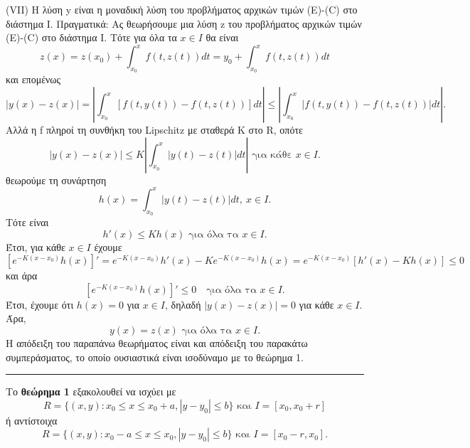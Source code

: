 \documentclass[11pt,a4paper,twoside]{book}
\newcommand{\eng}[1]{\selectlanguage{english}#1\selectlanguage{greek}}
\begin{document}
(VII) Η λύση y είναι η μοναδική λύση του προβλήματος αρχικών τιμών (E)-(C) στο διάστημα Ι. Πραγματικά: Ας θεωρήσουμε μια λύση z του προβλήματος αρχικών τιμών (E)-(C) στο διάστημα Ι. Τότε για όλα τα $x \in I$ θα είναι
\[
z(x) = z(x_0) + \int_{x_0}^x f(t,z(t))dt = y_0 + \int_{x_0}^x f(t,z(t))dt
\]
και επομένως
\[
|y(x)-z(x)| = \left| \int_{x_0}^x [f(t,y(t)) - f(t,z(t))]dt \right| \le \left| \int_{x_0}^x |f(t,y(t)) - f(t,z(t))|dt \right|.
\]
Αλλά η f πληροί τη συνθήκη του \eng{Lipschitz} με σταθερά K στο R, οπότε
\[
|y(x)-z(x)| \le K \left| \int_{x_0}^x |y(t)-z(t)|dt \right| \text{ για κάθε } x \in I.
\]
θεωρούμε τη συνάρτηση
\[
h(x) = \int_{x_0}^x |y(t)-z(t)|dt, \ x \in I.
\]
Τότε είναι
\[
h'(x) \le K h(x) \text{ για όλα τα } x \in I.
\]
Έτσι, για κάθε $x \in I$ έχουμε
\[
[e^{-K(x-x_0)}h(x)]' = e^{-K(x-x_0)}h'(x) - K e^{-K(x-x_0)}h(x) = e^{-K(x-x_0)}[h'(x)-Kh(x)] \le 0
\]
και άρα
\[
[e^{-K(x-x_0)}h(x)]' \le 0 \quad \text{για όλα τα } x \in I.
\]
Έτσι, έχουμε ότι $h(x)=0$ για $x \in I$, δηλαδή $|y(x)-z(x)|=0$ για κάθε $x \in I$. Άρα,
\[
y(x) = z(x) \text{ για όλα τα } x \in I.
\]
Η απόδειξη του παραπάνω θεωρήματος είναι και απόδειξη του παρακάτω συμπεράσματος, το οποίο ουσιαστικά είναι ισοδύναμο με το θεώρημα 1.

\begin{center}
\rule{0.5\textwidth}{0.4pt}
\end{center}

Το \textbf{θεώρημα 1} εξακολουθεί να ισχύει με
\[
R = \{(x,y): x_0 \le x \le x_0+a, |y-y_0| \le b\} \text{ και } I = [x_0, x_0+r]
\]
ή αντίστοιχα
\[
R = \{(x,y): x_0-a \le x \le x_0, |y-y_0| \le b\} \text{ και } I=[x_0-r,x_0].
\]
\end{document}
